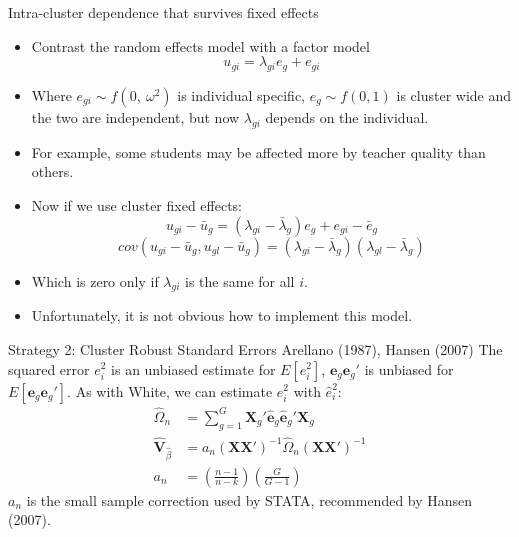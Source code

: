 \documentclass[aspectratio=169]{beamer}
\numberwithin{equation}{section}
\begin{document}
  
\begin{frame}{Intra-cluster dependence that survives fixed effects}
\begin{itemize}
\item Contrast the random effects model with a factor model
$$u_{gi}=\lambda_{gi} e_g+e_{gi}$$
\item Where $e_{gi}\sim f(0,\ \omega^2)$ is individual specific, $e_g\sim f(0,1)$ is cluster wide and the two are independent, but now $\lambda_{gi}$ depends on the individual. \pause
\item For example, some students may be affected more by teacher quality than others. \pause
\item Now if we use cluster fixed effects:
$$u_{gi}-\bar{u}_g=(\lambda_{gi}-\bar{\lambda}_g) e_g+e_{gi}-\bar{e}_g$$ \pause
$$cov(u_{gi}-\bar{u}_g, u_{gl}-\bar{u}_g)=(\lambda_{gi}-\bar{\lambda}_g)(\lambda_{gl}-\bar{\lambda}_g)$$ \pause
\item Which is zero only if $\lambda_{gi}$ is the same for all $i$. \pause
\item Unfortunately, it is not obvious how to implement this model.
\end{itemize}
\end{frame}
 
 
\begin{frame}{Strategy 2: Cluster Robust Standard Errors Arellano (1987), Hansen (2007)}
The squared error $e_i^2$ is an unbiased estimate for $E[e_i^2]$, $\bm{e}_g\bm{e}_g'$ is unbiased for $E[\bm{e}_g\bm{e}_g']$.  As with White, we can estimate $e_i^2$ with  $\hat{e}_i^2$:
\begin{align*}
\hat{\Omega}_n&=\sum_{g=1}^G\bm{X}_g'\bm{\hat{e}}_g\bm{\hat{e}}_g'\bm{X}_g\\
\hat{\bm{V}}_{\hat{\beta}}&=a_n\left(\bm{X}\bm{X}'\right)^{-1}\hat{\Omega}_n\left(\bm{X}\bm{X}'\right)^{-1}\\
a_n&=\left(\frac{n-1}{n-k}\right)\left(\frac{G}{G-1}\right)
\end{align*}
 $a_n$ is the small sample correction used by STATA, recommended by Hansen (2007).
 \end{frame}
\end{document}
